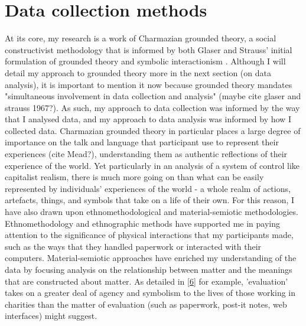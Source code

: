 
\section{Data collection methods}
At its core, my research is a work of Charmazian grounded theory, a social constructivist methodology that is informed by both Glaser and Strauss' initial formulation of grounded theory and symbolic interactionism \cite{charmaz_constructing_2006}. Although I will detail my approach to grounded theory more in the next section (on data analysis), it is important to mention it now because grounded theory mandates "simultaneous involvement in data collection and analysis" (maybe cite glaser and strauss 1967?). As such, my approach to data collection was informed by the way that I analysed data, and my approach to data analysis was informed by how I collected data. Charmazian grounded theory in particular places a large degree of importance on the talk and language that participant use to represent their experiences (cite Mead?), understanding them as authentic reflections of their experience of the world. Yet particularly in an analysis of a system of control like capitalist realism, there is much more going on than what can be easily represented by individuals' experiences of the world - a whole realm of actions, artefacts, things, and symbols that take on a life of their own. For this reason, I have also drawn upon ethnomethodological and material-semiotic methodologies. Ethnomethodology and ethnographic methods have supported me in paying attention to the significance of physical interactions that my participants made, such as the ways that they handled paperwork or interacted with their computers. Material-semiotic approaches have enriched my understanding of the data by focusing analysis on the relationship between matter and the meanings that are constructed about matter. As detailed in \ref{6} for example, 'evaluation' takes on a greater deal of agency and symbolism to the lives of those working in charities than the matter of evaluation (such as paperwork, post-it notes, web interfaces) might suggest. 

